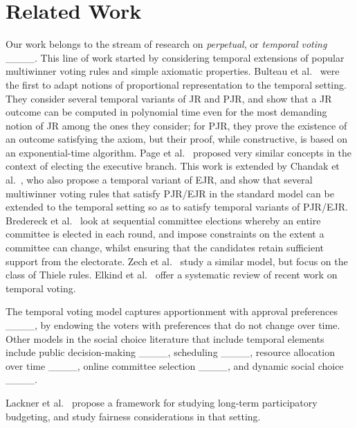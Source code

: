 \section{Related Work}
Our work belongs to the stream of research on \emph{perpetual}, or {\em temporal voting} ____.
This line of work started by considering temporal extensions of popular multiwinner voting rules and simple axiomatic properties.
Bulteau et al.~ were the first to adapt notions of proportional representation to the temporal setting. They 
consider several temporal variants of JR and PJR, and 
show that a JR outcome can be computed in polynomial time even for the most
demanding notion of JR among the ones they consider; for PJR, 
they prove the existence of an outcome satisfying the axiom, but their
proof, while constructive, is based on an exponential-time algorithm. Page et al.~ proposed very similar concepts in the context of electing the executive branch. This work is extended by Chandak et al.~, who also propose a temporal variant of EJR, 
and show that several multiwinner voting rules
that satisfy PJR/EJR in the standard model can be extended
to the temporal setting so as to satisfy temporal variants of PJR/EJR.
Bredereck et al.~ look at sequential committee elections whereby 
an entire committee is elected in each round, and impose
constraints on the extent a committee can change, whilst ensuring that the candidates retain sufficient support from the electorate.
Zech et al.~ study a similar model, but focus on the class of Thiele rules.
Elkind et al.~ offer a systematic review of recent work 
on temporal voting.

The temporal voting model captures apportionment with approval preferences ____, by endowing the voters with preferences that do not change over time.
Other models in the social choice literature that include temporal elements include
public decision-making ____, scheduling ____, resource allocation over time ____, online committee selection ____, and dynamic social choice ____.

Lackner et al.~ propose a framework for studying long-term participatory budgeting, and study fairness considerations in that setting.